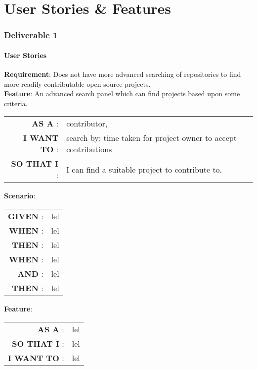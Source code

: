 \documentclass[12pt]{article}
\begin{document}
\pagebreak


\setcounter{part}{1}
\setcounter{section}{1}
\setcounter{subsection}{0}
\part{User Stories \& Features}
\section*{Deliverable 1}
\subsection{User Stories}

\textbf{Requirement}: Does not have more advanced searching of repositories to find more readily contributable open source projects.\\
\noindent \textbf{Feature}: An advanced search panel which can find projects based upon some criteria.

\begin{table}[!htb]
\begin{tabular}{|rl|}
\textsf{\textbf{AS A}} : & contributor,\\
\textsf{\textbf{I WANT TO}} : & search by: time taken for project owner to accept contributions\\
\textsf{\textbf{SO THAT I}} : & I can find a suitable project to contribute to.
\end{tabular}
\end{table}

\noindent \textbf{Scenario}:
\begin{table}[!htb]
\begin{tabular}{|rl|}
\textsf{\textbf{GIVEN}} : & lel\\
\textsf{\textbf{WHEN}} : & lel\\
\textsf{\textbf{THEN}} : & lel\\
\textsf{\textbf{WHEN}} : & lel\\
\textsf{\textbf{AND}} : & lel\\
\textsf{\textbf{THEN}} : & lel
\end{tabular}
\end{table}


\noindent \textbf{Feature}:
\begin{table}[!htb]
\begin{tabular}{|rl|}
\textsf{\textbf{AS A}} : & lel\\
\textsf{\textbf{SO THAT I}} : & lel\\
\textsf{\textbf{I WANT TO}} : & lel 
\end{tabular}
\end{table}
\end{document}
